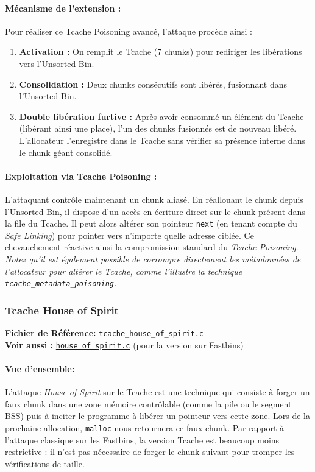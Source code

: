 \paragraph{Mécanisme de l'extension :}
Pour réaliser ce Tcache Poisoning avancé, l'attaque procède ainsi :
\begin{enumerate}
    \item \textbf{Activation :} On remplit le Tcache (7 chunks) pour rediriger les libérations vers l'Unsorted Bin.
    \item \textbf{Consolidation :} Deux chunks consécutifs sont libérés, fusionnant dans l'Unsorted Bin.
    \item \textbf{Double libération furtive :} Après avoir consommé un élément du Tcache (libérant ainsi une place), l'un des chunks fusionnés est de nouveau libéré. L'allocateur l'enregistre dans le Tcache sans vérifier sa présence interne dans le chunk géant consolidé.
\end{enumerate}

\paragraph{Exploitation via Tcache Poisoning :}
L'attaquant contrôle maintenant un chunk aliasé. En réallouant le chunk depuis l'Unsorted Bin, il dispose d'un accès en écriture direct sur le chunk présent dans la file du Tcache. Il peut alors altérer son pointeur \texttt{next} (en tenant compte du \textit{Safe Linking}) pour pointer vers n'importe quelle adresse ciblée. Ce chevauchement réactive ainsi la compromission standard du \textit{Tcache Poisoning}. \textit{Notez qu'il est également possible de corrompre directement les métadonnées de l'allocateur pour altérer le Tcache, comme l'illustre la technique \texttt{tcache\_metadata\_poisoning}.}


\subsubsection{Tcache House of Spirit}

\noindent\textbf{Fichier de Référence:} \href{https://github.com/shellphish/how2heap/blob/master/glibc_2.41/tcache_house_of_spirit.c}{\texttt{tcache\_house\_of\_spirit.c}}\\
\noindent\textbf{Voir aussi :} \href{https://github.com/shellphish/how2heap/blob/master/glibc_2.41/house_of_spirit.c}{\texttt{house\_of\_spirit.c}} (pour la version sur Fastbins)

\paragraph{Vue d'ensemble:}
L'attaque \textit{House of Spirit} sur le Tcache est une technique qui consiste à forger un faux chunk dans une zone mémoire contrôlable (comme la pile ou le segment BSS) puis à inciter le programme à libérer un pointeur vers cette zone. Lors de la prochaine allocation, \texttt{malloc} nous retournera ce faux chunk. Par rapport à l'attaque classique sur les Fastbins, la version Tcache est beaucoup moins restrictive : il n'est pas nécessaire de forger le chunk suivant pour tromper les vérifications de taille.

